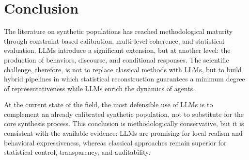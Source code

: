 \documentclass[11pt,a4paper]{article}
\begin{document}
\section{Conclusion}
The literature on synthetic populations has reached methodological maturity through constraint-based calibration, multi-level coherence, and statistical evaluation. LLMs introduce a significant extension, but at another level: the production of behaviors, discourse, and conditional responses. The scientific challenge, therefore, is not to replace classical methods with LLMs, but to build hybrid pipelines in which statistical reconstruction guarantees a minimum degree of representativeness while LLMs enrich the dynamics of agents.

At the current state of the field, the most defensible use of LLMs is to complement an already calibrated synthetic population, not to substitute for the core synthesis process. This conclusion is methodologically conservative, but it is consistent with the available evidence: LLMs are promising for local realism and behavioral expressiveness, whereas classical approaches remain superior for statistical control, transparency, and auditability.



\end{document}
